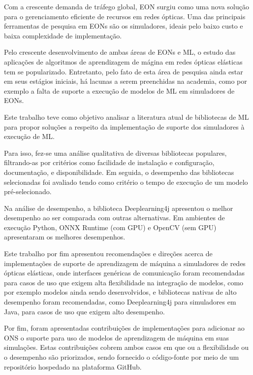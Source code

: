 Com a crescente demanda de tráfego global, \acrfull{EON} surgiu como uma nova solução para o gerenciamento eficiente de recursos em redes ópticas. Uma das principais ferramentas de pesquisa em EONs são os simuladores, ideais pelo baixo custo e baixa complexidade de implementação.

Pelo crescente desenvolvimento de ambas áreas de \acrfull{EONs} e \acrfull{ML}, o estudo das aplicações de algoritmos de aprendizagem de mágina em redes ópticas elásticas tem se popularizado. Entretanto, pelo fato de esta área de pesquisa ainda estar em seus estágios iniciais, há lacunas a serem preenchidas na academia, como por exemplo a falta de suporte a execução de modelos de ML em simuladores de EONs.

Este trabalho teve como objetivo analisar a literatura atual de bibliotecas de ML para propor soluções a respeito da implementação de suporte dos simuladores à execução de ML.

Para isso, fez-se uma análise qualitativa de diversas bibliotecas populares, filtrando-as por critérios como facilidade de instalação e configuração, documentação, e disponibilidade. Em seguida, o desempenho das bibliotecas selecionadas foi avaliado tendo como critério o tempo de execução de um modelo pré-selecionado.

Na análise de desempenho, a biblioteca Deeplearning4j apresentou o melhor desempenho ao ser comparada com outras alternativas. Em ambientes de execução Python, ONNX Runtime (com GPU) e OpenCV (sem GPU) apresentaram os melhores desempenhos.

Este trabalho por fim apresentou recomendações e direções acerca de implementações de suporte de aprendizagem de máquina a simuladores de redes ópticas elásticas, onde interfaces genéricas de comunicação foram recomendadas para casos de uso que exigem alta flexibilidade na integração de modelos, como por exemplo modelos ainda sendo desenvolvidos, e bibliotecas nativas de alto desempenho foram recomendadas, como Deeplearning4j para simuladores em Java, para casos de uso que exigem alto desempenho.

Por fim, foram apresentadas contribuições de implementações para adicionar ao \acrfull{ONS} o suporte para uso de modelos de aprendizagem de máquina em suas simulações. Estas contribuições cobrem ambos casos em que ou a flexibilidade ou o desempenho são priorizados, sendo fornecido o código-fonte por meio de um repositório hospedado na plataforma GitHub.
